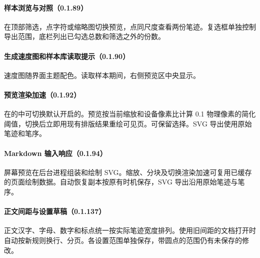 \paragraph{样本浏览与对照（0.1.89）}在顶部筛选，点字符或缩略图切换预览，点同尺度查看两份笔迹。复选框单独控制导出范围，底栏列出已勾选总数和筛选之外的份数。

\paragraph{生成速度图和样本库读取提示（0.1.90）}速度图随界面主题配色。读取样本期间，右侧预览区中央显示。

\paragraph{预览渲染加速（0.1.92）}在的中可切换默认开启的。预览按当前缩放和设备像素比计算 0.1 物理像素的简化阈值，切换后立即用现有排版结果重绘可见页。可保留选择。SVG 导出使用原始笔迹和笔序。

\paragraph{Markdown 输入响应（0.1.94）}屏幕预览在后台进程组装和绘制 SVG。缩放、分块及切换渲染加速可复用已缓存的页面绘制数据。自动恢复副本按原有时机保存，SVG 导出沿用原始笔迹与笔序。

\paragraph{正文间距与设置草稿（0.1.137）}正文汉字、字母、数字和标点统一按实际笔迹宽度排列。使用旧间距的文档打开时自动按新规则换行、分页。各设置范围单独保存，带圆点的范围仍有未保存的修改。

